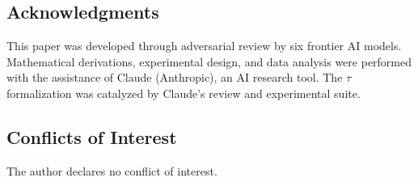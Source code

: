 \documentclass[12pt,a4paper]{article}
\begin{document}
\subsection*{Acknowledgments}

This paper was developed through adversarial review by six frontier AI models. Mathematical derivations, experimental design, and data analysis were performed with the assistance of Claude (Anthropic), an AI research tool. The $\tau$ formalization was catalyzed by Claude's review and experimental suite.

\subsection*{Conflicts of Interest}

The author declares no conflict of interest.
\end{document}
